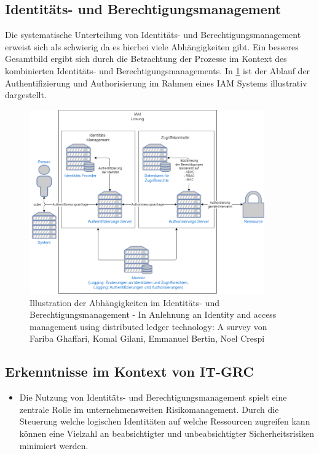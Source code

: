 \documentclass[12pt]{article}
\begin{document}
\subsection{Identitäts- und Berechtigungsmanagement}
Die systematische Unterteilung von Identitäts- und Berechtigungsmanagement erweist sich als schwierig da es hierbei viele Abhängigkeiten gibt. Ein besseres Gesamtbild ergibt sich durch die Betrachtung der Prozesse im Kontext des kombinierten Identitäts- und Berechtigungsmanagements. In \cref{figure:iam} ist der Ablauf der Authentifizierung und Authorisierung im Rahmen eines IAM Systems illustrativ dargestellt.
\begin{figure}[H]
  \centering
  \includegraphics[width=0.9\textwidth]{assets/accessmanagement2.png}
  \caption{Illustration der Abhängigkeiten im Identitäts- und Berechtigungsmanagement - In Anlehnung an Identity and access management using distributed ledger
    technology: A survey von Fariba Ghaffari, Komal Gilani, Emmanuel Bertin, Noel Crespi}\label{figure:iam}
\end{figure}
\subsection{Erkenntnisse im Kontext von IT-GRC}
\begin{itemize}
  \item Die Nutzung von Identitäts- und Berechtigungsmanagement spielt eine zentrale Rolle im unternehmensweiten Risikomanagement. Durch die Steuerung welche logischen Identitäten auf welche Ressourcen zugreifen kann können eine Vielzahl an beabsichtigter und unbeabsichtigter Sicherheitsrisiken minimiert werden.
\end{itemize}
\end{document}
